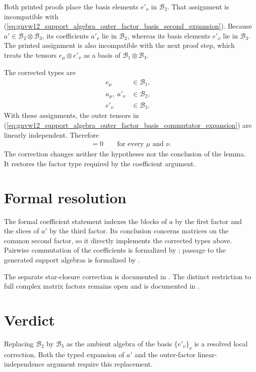 \documentclass[11pt]{article}
\begin{document}
Both printed proofs place the basis elements $e'_\nu$ in $\mathcal B_2$.
That assignment is incompatible with
(\ref{eq:gnvw12_support_algebra_outer_factor_basis_second_expansion}).
Because $a'\in\mathcal B_2\otimes\mathcal B_3$, its coefficients
$a'_\nu$ lie in $\mathcal B_2$, whereas its basis elements $e'_\nu$ lie in
$\mathcal B_3$. The printed assignment is also incompatible with the next
proof step, which treats the tensors $e_\mu\otimes e'_\nu$ as a basis of
$\mathcal B_1\otimes\mathcal B_3$.

The corrected types are
\begin{align}
    e_\mu
        &\in\mathcal B_1,
    \label{eq:gnvw12_support_algebra_outer_factor_basis_first_basis_type}\\
    a_\mu,\ a'_\nu
        &\in\mathcal B_2,
    \label{eq:gnvw12_support_algebra_outer_factor_basis_middle_coefficient_type}\\
    e'_\nu
        &\in\mathcal B_3.
    \label{eq:gnvw12_support_algebra_outer_factor_basis_third_basis_type}
\end{align}
With these assignments, the outer tensors in
(\ref{eq:gnvw12_support_algebra_outer_factor_basis_commutator_expansion})
are linearly independent. Therefore
\begin{align}
    [a_\mu,a'_\nu]
        &=0
        \qquad\text{for every $\mu$ and $\nu$}.
    \label{eq:gnvw12_support_algebra_outer_factor_basis_coefficient_commutation}
\end{align}
The correction changes neither the hypotheses nor the conclusion of the
lemma. It restores the factor type required by the coefficient argument.

\section{Formal resolution}

The formal coefficient statement indexes the blocks of $a$ by the first
factor and the slices of $a'$ by the third factor. Its conclusion concerns
matrices on the common second factor, so it directly implements the corrected
types above. Pairwise commutation of the coefficients is formalized by
; passage to
the generated support algebras is formalized by
.

The separate star-closure correction is documented in
. The distinct
restriction to full complex matrix factors remains open and is documented in
.

\section{Verdict}

Replacing $\mathcal B_2$ by $\mathcal B_3$ as the ambient algebra of the
basis $\{e'_\nu\}_\nu$ is a resolved local correction. Both the typed
expansion of $a'$ and the outer-factor linear-independence argument require
this replacement.



\end{document}
